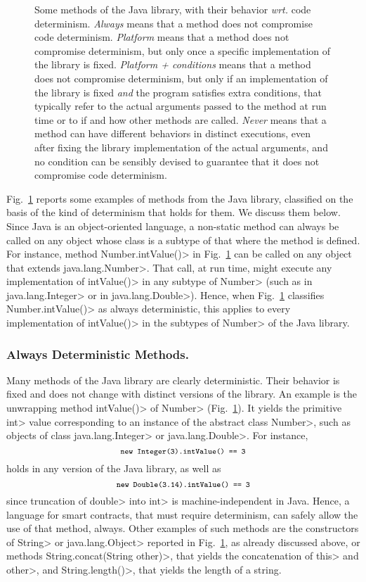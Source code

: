 \begin{figure}[t]
  \caption{Some methods of the Java library, with their behavior \emph{wrt.} code determinism.
\emph{Always} means that a method does not compromise code determinism.
\emph{Platform} means that
a method does not compromise determinism, but only once a specific implementation
of the library is fixed. \emph{Platform + conditions} means that a method
does not compromise determinism, but only if an implementation of the library is fixed
\emph{and} the program satisfies extra conditions, that typically refer to
the actual arguments passed to the method at run time or to if and how
other methods are called. \emph{Never} means
that a method can have different behaviors in distinct executions,
even after fixing the library implementation of the actual arguments, and no
condition can be sensibly devised to guarantee that it does not compromise code
determinism.}\label{fig:determinism}
\end{figure}

Fig.~\ref{fig:determinism} reports some examples of methods
from the Java library, classified
on the basis of the kind of determinism that holds for them.
We discuss them below. Since Java is an object-oriented language,
a non-static method can always be called on any object whose class
is a subtype of that where the method is defined. For instance, method \<Number.intValue()> in
Fig.~\ref{fig:determinism} can be called on any object that extends
\<java.lang.Number>. That call, at run time, might
execute any implementation of \<intValue()> in any subtype of \<Number>
(such as in \<java.lang.Integer> or in \<java.lang.Double>).
Hence, when Fig.~\ref{fig:determinism} classifies \<Number.intValue()> as always
deterministic, this applies to every implementation of
\<intValue()> in the subtypes of \<Number> of the Java library.

\subsubsection*{Always Deterministic Methods.}
Many methods of the Java library are clearly deterministic. Their behavior is fixed
and does not change with distinct versions of the library. An example is the unwrapping
method \<intValue()> of \<Number> (Fig.~\ref{fig:determinism}). It yields
the primitive \<int> value corresponding to an instance of the abstract class \<Number>, such
as objects of class \<java.lang.Integer> or \<java.lang.Double>. For instance,
\[
\<new Integer(3).intValue() == 3>
\]
holds in any version of the Java library, as well as
\[
\<new Double(3.14).intValue() == 3>
\]
since truncation of \<double> into \<int> is machine-independent in Java.
Hence, a language for smart contracts, that must require determinism,
can safely allow the use of that method, always. Other examples of such methods
are the constructors of \<String> or \<java.lang.Object>
reported in Fig.~\ref{fig:determinism}, as already discussed above, or methods
\<String.concat(String other)>, that yields the concatenation of \<this> and \<other>,
and \<String.length()>, that yields the length of a string.

